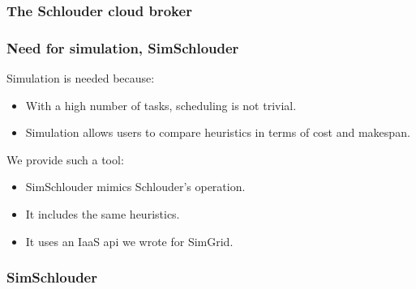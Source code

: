 \documentclass{beamer}
\begin{document}

\begin{frame}
	\frametitle{The Schlouder cloud broker}
	\resizebox{\textwidth}{!}{}
\end{frame}



\begin{frame}
	\frametitle{Need for simulation, SimSchlouder}
	Simulation is needed because:
	\begin{itemize}
		\item With a high number of tasks, scheduling is not trivial.
		\item Simulation allows users to compare heuristics in terms of
			cost and makespan.
	\end{itemize}
	We provide such a tool:
	\begin{itemize}
		\item SimSchlouder mimics Schlouder's operation.
		\item It includes the same heuristics.
		\item It uses an IaaS api we wrote for SimGrid.
	\end{itemize}
\end{frame}
	
\begin{frame}
	\frametitle{SimSchlouder}
	\resizebox{\textwidth}{!}{}
\end{frame}
\end{document}
